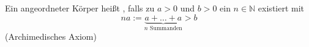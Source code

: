 Ein angeordneter Körper heißt , falls zu $a > 0$ und $b > 0$ ein $n \in \mathbb{N}$ existiert mit
$$na := \underbrace{a+\dots+a}_{\text{$n$ Summanden}} > b$$
(Archimedisches Axiom)